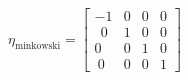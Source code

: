 \documentclass[preview]{standalone}
\begin{document}
\begin{align*}
\eta_\text{minkowski} = \begin{bmatrix} -1 & 0 & 0 & 0 \\ \
                \ 0 & 1 & 0 & 0 \\ 0 & 0 & 1 & 0 \\ \
                0 & 0 & 0 & 1 \end{bmatrix}
\end{align*}
\end{document}
